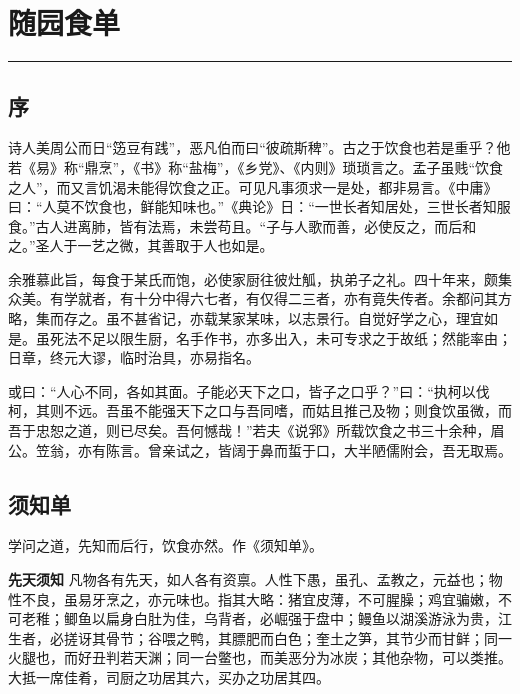 \documentclass[]{article}
\date{}
\begin{document}
\hypertarget{header-n5}{%
\section{随园食单}\label{header-n5}}

\begin{center}\rule{0.5\linewidth}{\linethickness}\end{center}

\hypertarget{header-n8}{%
\subsection{序}\label{header-n8}}

诗人美周公而日``笾豆有践''，恶凡伯而曰``彼疏斯稗''。古之于饮食也若是重乎？他若《易》称``鼎烹''，《书》称``盐梅''，《乡党》、《内则》琐琐言之。孟子虽贱``饮食之人''，而又言饥渴未能得饮食之正。可见凡事须求一是处，都非易言。《中庸》曰：``人莫不饮食也，鲜能知味也。''《典论》日：``一世长者知居处，三世长者知服食。''古人进离肺，皆有法焉，未尝苟且。``子与人歌而善，必使反之，而后和之。''圣人于一艺之微，其善取于人也如是。

余雅慕此旨，每食于某氏而饱，必使家厨往彼灶觚，执弟子之礼。四十年来，颇集众美。有学就者，有十分中得六七者，有仅得二三者，亦有竟失传者。余都问其方略，集而存之。虽不甚省记，亦载某家某味，以志景行。自觉好学之心，理宜如是。虽死法不足以限生厨，名手作书，亦多出入，未可专求之于故纸；然能率由；日章，终元大谬，临时治具，亦易指名。

或曰：``人心不同，各如其面。子能必天下之口，皆子之口乎？''曰：``执柯以伐柯，其则不远。吾虽不能强天下之口与吾同嗜，而姑且推己及物；则食饮虽微，而吾于忠恕之道，则已尽矣。吾何憾哉！''若夫《说郛》所载饮食之书三十余种，眉公。笠翁，亦有陈言。曾亲试之，皆阔于鼻而蜇于口，大半陋儒附会，吾无取焉。

\hypertarget{header-n9}{%
\subsection{须知单}\label{header-n9}}

学问之道，先知而后行，饮食亦然。作《须知单》。

\textbf{先天须知}
凡物各有先天，如人各有资禀。人性下愚，虽孔、孟教之，元益也；物性不良，虽易牙烹之，亦元味也。指其大略：猪宜皮薄，不可腥臊；鸡宜骗嫩，不可老稚；鲫鱼以扁身白肚为佳，乌背者，必崛强于盘中；鳗鱼以湖溪游泳为贵，江生者，必搓讶其骨节；谷喂之鸭，其膘肥而白色；奎土之笋，其节少而甘鲜；同一火腿也，而好丑判若天渊；同一台鳖也，而美恶分为冰炭；其他杂物，可以类推。大抵一席佳肴，司厨之功居其六，买办之功居其四。
\end{document}
